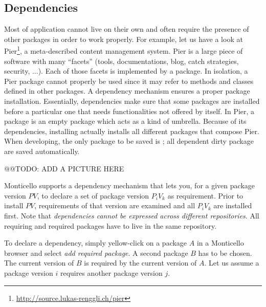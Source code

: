 \documentclass[a4paper,10pt,twoside]{book}
\begin{document}
 

\subsection{Dependencies}

Most of application cannot live on their own and often require the presence of other packages in order to work properly. For example, let us have a look at Pier\footnote{\url{http://source.lukas-renggli.ch/pier}}, a meta-described content management system. Pier is a large piece of software with many ``facets'' (tools, documentations, blog, catch strategies, security, ...). Each of those facets is implemented by a package. In isolation, a Pier package cannot properly be used since it may refer to methods and classes defined in other packages. A dependency mechanism ensures a proper package installation. Essentially, dependencies make sure that some packages are installed before a particular one that needs functionalities not offered by itself. In Pier, a package  is an empty package which acts as a kind of umbrella. Because of its dependencies, installing  actually installs all different packages that compose Pier. When developing, the only package to be saved is ; all dependent dirty package are saved automatically.

@@TODO: ADD A PICTURE HERE

Monticello supports a dependency mechanism that lets you, for a given package version $PV$, to declare a set of package version $P_{i}V_{k}$ as requirement. Prior to install $PV$, requirements of that version are examined and all $P_{i}V_{k}$ are installed first. Note that \emph{dependencies cannot be expressed across different repositories}. All requiring and required packages have to live in the same repository.


To declare a dependency, simply yellow-click on a package $A$ in a Monticello browser and select \emph{add required package}. A second package $B$ has to be chosen. The current version of $B$ is required by the current version of $A$. Let us assume a package  version $i$ requires another package  version $j$.
\end{document}
